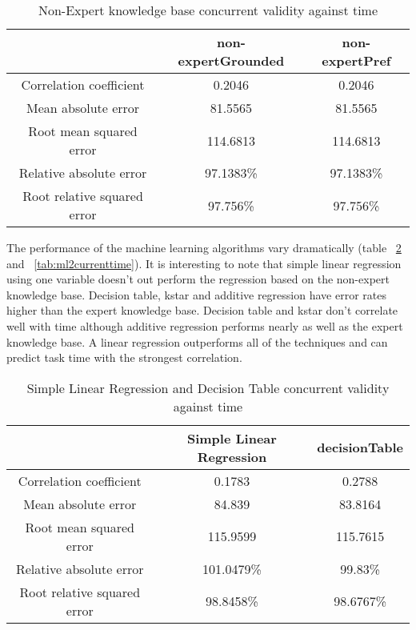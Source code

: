 \begin{table}[!htbp]
\centering
\begin{tabular}{|c|c|c|}
\hline
                            &   non-expertGrounded  & non-expertPref \\ \hline
Correlation coefficient     &  0.2046         & 0.2046  \\
Mean absolute error         &  81.5565        & 81.5565  \\
Root mean squared error     & 114.6813       & 114.6813  \\
Relative absolute error     & 97.1383\%      & 97.1383\%  \\
Root relative squared error & 97.756\%       & 97.756\%  \\
\hline
\end{tabular}
\caption{Non-Expert knowledge base concurrent validity against time}
\label{tab:neccurrent_time}
\end{table}

The performance of the machine learning algorithms vary dramatically (table ~\ref{tab:ml1currenttime} and ~\ref{tab:ml2currenttime}). It is interesting to note that simple linear regression using one variable doesn't out perform the regression based on the non-expert knowledge base. Decision table, kstar and additive regression have error rates higher than the expert knowledge base. Decision table and kstar don't correlate well with time although additive regression performs nearly as well as the expert knowledge base. A linear regression outperforms all of the techniques and can predict task time with the strongest correlation.

\begin{table}[!htbp]
\centering
\begin{tabular}{|c|c|c|}
\hline
                            & Simple Linear Regression   & decisionTable\\ \hline
Correlation coefficient     & 0.1783        & 0.2788    \\
Mean absolute error         & 84.839        & 83.8164   \\
Root mean squared error     & 115.9599      & 115.7615  \\
Relative absolute error     & 101.0479\%    & 99.83\%   \\
Root relative squared error & 98.8458\%     & 98.6767\% \\
\hline
\end{tabular}
\caption{Simple Linear Regression and Decision Table concurrent validity against time}
\label{tab:ml1currenttime}
\end{table}

